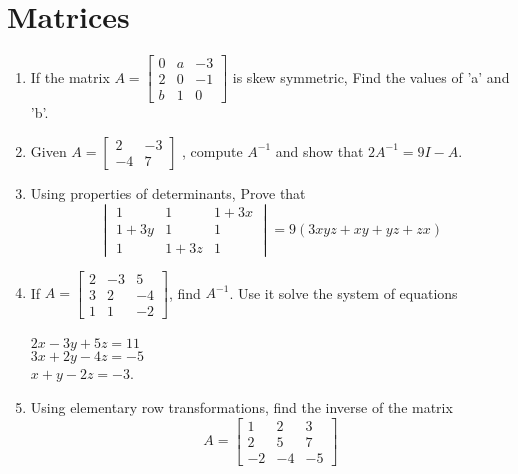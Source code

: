 \documentclass{article}
\newcommand{\mydet}[1]{\ensuremath{\begin{vmatrix}#1\end{vmatrix}}}
\providecommand{\brak}[1]{\ensuremath{\left(#1\right)}}
\begin{document}
\section{Matrices}
\begin{enumerate}
 \item If the matrix $ A=\begin{bmatrix}
		0 & a & -3\\
		2 & 0 & -1\\
		b & 1 & 0
                \end{bmatrix}$ is skew symmetric, Find the values of 'a' and 'b'.
\item Given $ A = \begin{bmatrix}
		2 & -3\\
		-4 & 7
\end{bmatrix}$ , compute $A^{-1}$ and show that $2A^{-1}=9I - A$.
\item Using properties of determinants, Prove that \[ \mydet{
		1 & 1 & 1+3x \\
		1+3y & 1 & 1 \\
		1 & 1+3z & 1}
	=9\brak{3xyz+xy+yz+zx}\]
\item If $A=\begin{bmatrix}
		2 & -3 & 5 \\
		3 & 2 & -4 \\
		1 & 1 & -2
\end{bmatrix}$, find $ A^{-1}$. Use it solve the system of equations\\
\\
$2x-3y+5z=11$\\
$3x+2y-4z=-5$\\
$x+y-2z=-3$.
\item Using elementary row transformations, find the inverse of the matrix 
	\[  A=\begin{bmatrix}
		1 & 2 & 3\\
		2 & 5 & 7\\
		-2 & -4 & -5
	\end{bmatrix}\]
\end{enumerate}
\end{document}
